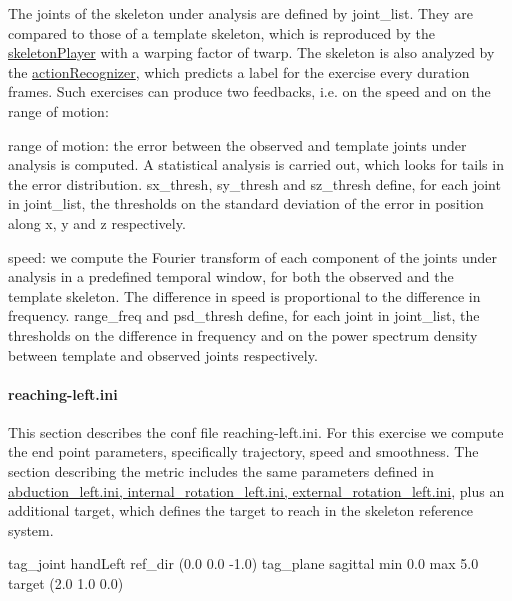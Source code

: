 The joints of the skeleton under analysis are defined by {\ttfamily joint\+\_\+list}. They are compared to those of a template skeleton, which is reproduced by the \hyperlink{group__skeletonPlayer}{skeleton\+Player} with a warping factor of {\ttfamily twarp}. The skeleton is also analyzed by the \hyperlink{group__actionRecognizer}{action\+Recognizer}, which predicts a label for the exercise every {\ttfamily duration} frames. Such exercises can produce two feedbacks, i.\+e. on the speed and on the range of motion\+:


\begin{DoxyItemize}
\item range of motion\+: the error between the observed and template joints under analysis is computed. A statistical analysis is carried out, which looks for tails in the error distribution. {\ttfamily sx\+\_\+thresh}, {\ttfamily sy\+\_\+thresh} and {\ttfamily sz\+\_\+thresh} define, for each joint in {\ttfamily joint\+\_\+list}, the thresholds on the standard deviation of the error in position along x, y and z respectively.
\item speed\+: we compute the Fourier transform of each component of the joints under analysis in a predefined temporal window, for both the observed and the template skeleton. The difference in speed is proportional to the difference in frequency. {\ttfamily range\+\_\+freq} and {\ttfamily psd\+\_\+thresh} define, for each joint in {\ttfamily joint\+\_\+list}, the thresholds on the difference in frequency and on the power spectrum density between template and observed joints respectively.
\end{DoxyItemize}\hypertarget{group__motionAnalyzer_sec-reaching}{}\paragraph{reaching-\/left.\+ini}\label{group__motionAnalyzer_sec-reaching}
This section describes the conf file reaching-\/left.\+ini. For this exercise we compute the end point parameters, specifically trajectory, speed and smoothness. The section describing the metric includes the same parameters defined in \hyperlink{group__motionAnalyzer_sec-abduction}{abduction\+\_\+left.\+ini, internal\+\_\+rotation\+\_\+left.\+ini, external\+\_\+rotation\+\_\+left.\+ini}, plus an additional {\ttfamily target}, which defines the target to reach in the skeleton reference system.


\begin{DoxyCode}
[EP\_0]
tag\_joint                      handLeft
ref\_dir                        (0.0 0.0 -1.0)
tag\_plane                      sagittal
min                            0.0
max                            5.0
target                         (2.0 1.0 0.0)
\end{DoxyCode}


